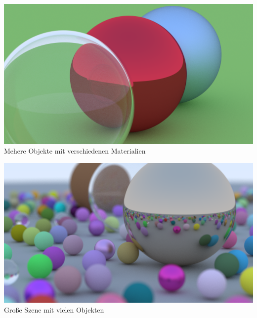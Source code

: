 \documentclass[a4paper, 10pt]{article}
\begin{document}
\begin{minipage}[t]{0.5\linewidth}
    \centering
    \includegraphics[width=\linewidth]{images/multiple_objects.png}
    Mehere Objekte mit verschiedenen Materialien

    \includegraphics[width=\linewidth]{images/large_scene.png}
    Große Szene mit vielen Objekten

\end{minipage}
\end{document}

